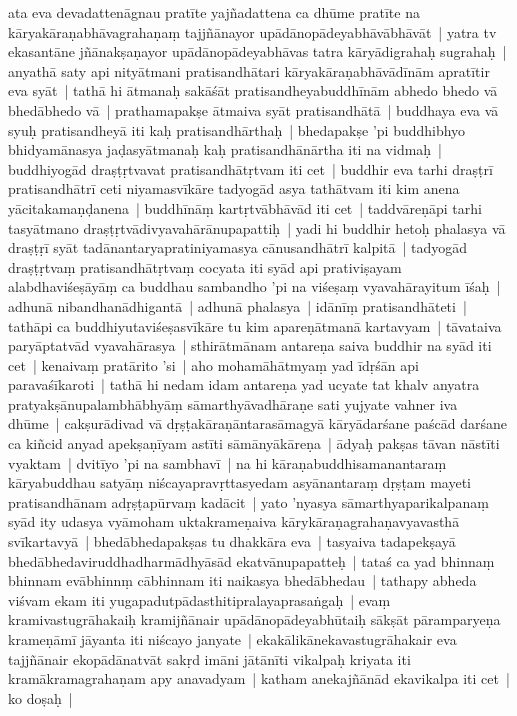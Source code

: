 \documentclass[article,12pt,a4paper]{memoir}%
\begin{document}
	  
	  \pstart \leavevmode%
	\label{thakur75-125.26}ata eva devadattenāgnau pratīte yajñadattena ca dhūme pratīte na kāryakāraṇabhāvagrahaṇaṃ tajjñānayor upādānopādeyabhāvābhāvāt | yatra tv ekasantāne jñānakṣaṇayor upādānopādeyabhāvas tatra kāryādigrahaḥ sugrahaḥ | anyathā saty api nityātmani pratisandhātari kāryakāraṇabhāvādīnām apratītir eva syāt | \label{thakur75-125.30} tathā hi ātmanaḥ sakāśāt pratisandheyabuddhīnām abhedo bhedo vā bhedābhedo vā | \label{thakur75-125.31} prathamapakṣe ātmaiva syāt pratisandhātā | buddhaya eva vā syuḥ pratisandheyā iti kaḥ pratisandhārthaḥ | \label{thakur75-125.32} bhedapakṣe 'pi buddhibhyo bhidyamānasya jaḍasyātmanaḥ kaḥ pratisandhānārtha iti na vidmaḥ | \label{thakur75-125.33} buddhiyogād draṣṭṛtvavat pratisandhātṛtvam iti cet | \label{thakur75-126.1} buddhir eva tarhi draṣṭrī pratisandhātrī ceti niyamasvīkāre tadyogād asya tathātvam iti kim anena yācitakamaṇḍanena | \label{thakur75-126.2} buddhīnāṃ kartṛtvābhāvād iti cet | \label{thakur75-126.2a} taddvāreṇāpi tarhi tasyātmano draṣṭṛtvādivyavahārānupapattiḥ | yadi hi buddhir hetoḥ phalasya vā draṣṭṛī syāt tadānantaryapratiniyamasya cānusandhātrī kalpitā | tadyogād draṣṭṛtvaṃ pratisandhātṛtvaṃ cocyata iti syād api prativiṣayam alabdhaviśeṣāyāṃ ca buddhau sambandho 'pi na viśeṣaṃ vyavahārayitum īśaḥ | adhunā nibandhanādhigantā | adhunā phalasya | idānīṃ pratisandhāteti | tathāpi ca buddhiyutaviśeṣasvīkāre tu kim apareṇātmanā kartavyam | tāvataiva paryāptatvād vyavahārasya | \label{thakur75-126.9} sthirātmānam antareṇa saiva buddhir na syād iti cet | \label{thakur75-126.9a} kenaivaṃ pratārito 'si | aho mohamāhātmyaṃ yad īdṛśān api paravaśīkaroti | tathā hi nedam idam antareṇa yad ucyate tat khalv anyatra pratyakṣānupalambhābhyāṃ sāmarthyāvadhāraṇe sati yujyate vahner iva dhūme | cakṣurādivad vā dṛṣṭakāraṇāntarasāmagyā kāryādarśane paścād darśane ca kiñcid anyad apekṣaṇīyam astīti sāmānyākāreṇa | \label{thakur75-126.14} ādyaḥ pakṣas tāvan nāstīti vyaktam | dvitīyo 'pi na sambhavī | na hi kāraṇabuddhisamanantaraṃ kāryabuddhau satyāṃ niścayapravṛttasyedam asyānantaraṃ dṛṣṭam mayeti pratisandhānam adṛṣṭapūrvaṃ kadācit | yato 'nyasya sāmarthyaparikalpanaṃ syād ity udasya vyāmoham uktakrameṇaiva kārykāraṇagrahaṇavyavasthā svīkartavyā | \label{thakur75-126.18} bhedābhedapakṣas tu dhakkāra eva | tasyaiva tadapekṣayā bhedābhedaviruddhadharmādhyāsād ekatvānupapatteḥ | tataś ca yad bhinnaṃ bhinnam evābhinnṃ cābhinnam iti naikasya bhedābhedau | tathapy abheda viśvam ekam iti yugapadutpādasthitipralayaprasaṅgaḥ | \label{thakur75-126.20} evaṃ kramivastugrāhakaiḥ kramijñānair upādānopādeyabhūtaiḥ sākṣāt pāramparyeṇa krameṇāmī jāyanta iti niścayo janyate | ekakālikānekavastugrāhakair eva tajjñānair ekopādānatvāt sakṛd imāni jātānīti vikalpaḥ kriyata iti kramākramagrahaṇam apy anavadyam | \label{thakur75-126.24} katham anekajñānād ekavikalpa iti cet | \label{thakur75-126.24a} ko doṣaḥ |
\end{document}

